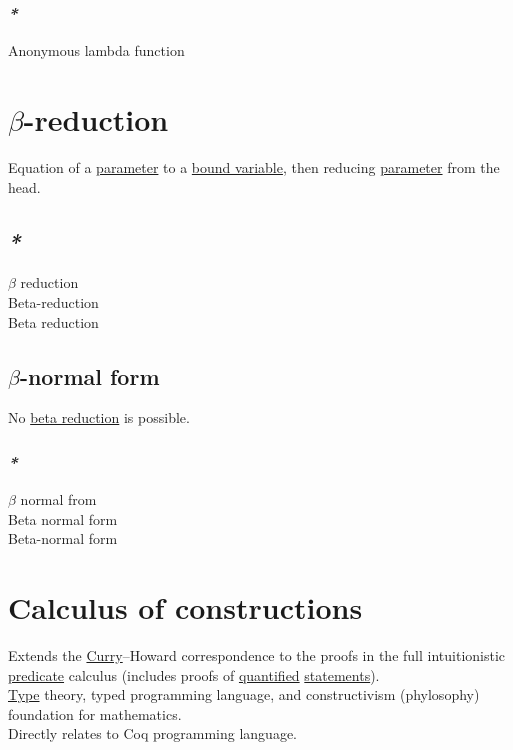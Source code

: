 \documentclass[a4paper,14pt,oneside]{book}
\begin{document}
\subsubsection{\emph{*}}
\label{sec:org762d849}

\label{orga8a825c}Anonymous lambda function\\

\section{\label{orga87647e}\(\beta\)-reduction}
\label{sec:org9400423}
Equation of a \hyperref[orga2e5d96]{parameter} to a \hyperref[orga0a2bb1]{bound variable}, then reducing \hyperref[orga2e5d96]{parameter} from the head.\\

\subsection{\emph{*}}
\label{sec:orgf1506b6}

\label{org6a8c7a0}\(\beta\) reduction\\
\label{orgd7e7d93}Beta-reduction\\
\label{org5d9f3ad}Beta reduction\\

\subsection{\label{orgbb0b964}\(\beta\)-normal form}
\label{sec:orgba743d7}
No \hyperref[org5d9f3ad]{beta reduction} is possible.\\

\subsubsection{\emph{*}}
\label{sec:org45195ed}

\label{org479f2cf}\(\beta\) normal from\\
\label{org45f5382}Beta normal form\\
\label{org7985f76}Beta-normal form\\

\section{\label{orgf0b34ed}Calculus of constructions}
\label{sec:orgd44fa95}
Extends the \hyperref[orge5fc1e7]{Curry}–Howard correspondence to the proofs in the full intuitionistic \hyperref[org5391aed]{predicate} calculus (includes proofs of \hyperref[orga03f740]{quantified} \hyperref[org878aa00]{statements}).\\
\hyperref[orgdbcea73]{Type} theory, typed programming language, and constructivism (phylosophy) foundation for mathematics.\\
Directly relates to Coq programming language.\\
\end{document}
